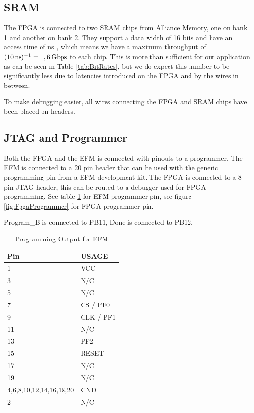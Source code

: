 \subsection{SRAM}
\label{subsec:sram}
The FPGA is connected to two SRAM chips from Alliance Memory, one on bank 1 and another on bank 2.
They support a data width of 16 bits and have an access time of \unit[10]{ns} \cite{sramdatasheet}, which means we have a maximum throughput of $(\unit[10]{ns})^{-1} = \unit[1,6]{Gbps}$ to each chip.
This is more than sufficient for our application as can be seen in Table \ref{tab:BitRates}, but we do expect this number to be significantly less due to latencies introduced on the FPGA and by the wires in between.

To make debugging easier, all wires connecting the FPGA and SRAM chips have been placed on headers.

\subsection{JTAG and Programmer}
Both the FPGA and the EFM is connected with pinouts to a programmer.
The EFM is connected to a 20 pin header that can be used with the generic programming pin from a EFM development kit.
The FPGA is connected to a 8 pin JTAG header, this can be routed to a debugger used for FPGA programming.
See table \ref{tab:EfmProgrammer} for EFM programmer pin, see figure \ref{fig:FpgaProgrammer} for FPGA programmer pin.

Program\_B is connected to PB11, Done is connected to PB12.
\begin{table}[]
    \centering
    \begin{tabular}{ll}
        Pin                     & USAGE     \\
        \hline
        1                       & VCC       \\
        3                       & N/C       \\
        5                       & N/C       \\
        7                       & CS / PF0  \\
        9                       & CLK / PF1 \\
        11                      & N/C       \\
        13                      & PF2       \\
        15                      & RESET     \\
        17                      & N/C       \\
        19                      & N/C       \\
        4,6,8,10,12,14,16,18,20 & GND       \\
        2                       & N/C
    \end{tabular}
    \caption{Programming Output for EFM}
    \label{tab:EfmProgrammer}
\end{table}


